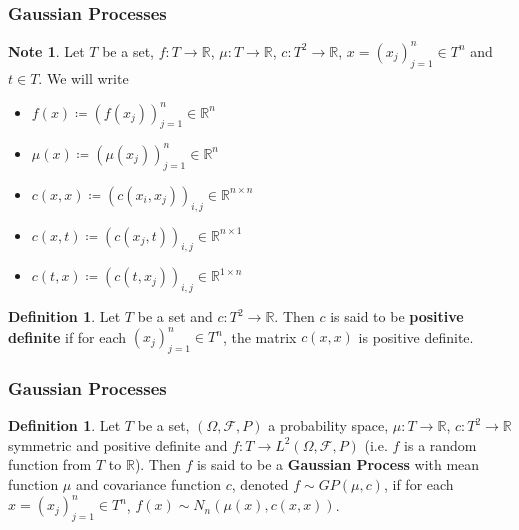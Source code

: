 \documentclass[notheorems]{beamer}
\theoremstyle{definition}
\newtheorem{defn}[definition]{Definition}
\newtheorem{nota}[definition]{Note}
\newcommand{\Om}{\Omega}
\newcommand{\R}{\mathbb{R}}
\newcommand{\MF}{\mathcal{F}}
\begin{document}
\begin{frame}
\frametitle{Gaussian Processes}

\begin{nota}
Let $T$ be a set, $f:T \rightarrow \R$, $\mu: T \rightarrow \R$, $c: T^2 \rightarrow \R$, $x = (x_j)_{j=1}^n \in T^n$ and $t \in T$. 
We will write 
\begin{itemize}
\item $f(x) \coloneqq (f(x_j))_{j =1}^n \in \R^n$
\item $\mu(x) \coloneqq (\mu(x_j))_{j =1}^n \in \R^n$ 
\item $c(x, x) \coloneqq (c(x_i, x_j))_{i,j} \in \R^{n \times n}$
\item $c(x, t) \coloneqq (c(x_j, t))_{i,j} \in \R^{n \times 1}$
\item $c(t, x) \coloneqq (c(t, x_j))_{i,j} \in \R^{1 \times n}$
\end{itemize}

\end{nota}

\begin{defn}
Let $T$ be a set and $c: T^2 \rightarrow \R$. Then $c$ is said to be \textbf{positive definite} if for each $(x_j)_{j=1}^n \in T^n$, the matrix $c(x,x)$ is positive definite. 
\end{defn}

\end{frame}









\begin{frame}
\frametitle{Gaussian Processes}

\begin{defn}
Let $T$ be a set, $(\Om, \MF, P)$ a probability space, $\mu : T \rightarrow \R$, $c: T^2 \rightarrow \R$ symmetric and positive definite and $f: T \rightarrow L^2(\Om, \MF, P)$ (i.e. $f$ is a random function from $T$ to $\R$). Then $f$ is said to be a \textbf{Gaussian Process} with mean function $\mu$ and covariance function $c$, denoted $f \sim GP(\mu, c)$, if for each $x = (x_j)_{j=1}^n \in T^n$, $f(x) \sim N_{n}(\mu(x), c(x,x))$. 
\end{defn}
\end{frame}
\end{document}
